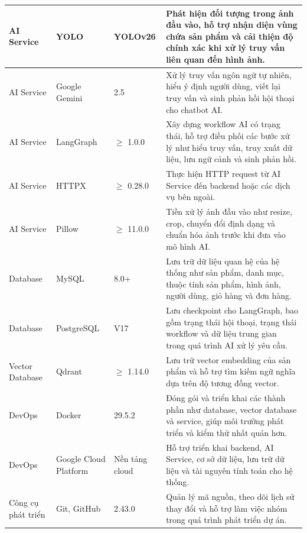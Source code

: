 \begin{longtable}{|p{2.6cm}|p{3.1cm}|p{2.4cm}|p{6.3cm}|}
AI Service 
& YOLO 
& YOLOv26
& Phát hiện đối tượng trong ảnh đầu vào, hỗ trợ nhận diện vùng chứa sản phẩm và cải thiện độ chính xác khi xử lý truy vấn liên quan đến hình ảnh. \\
\hline

AI Service 
& Google Gemini 
& 2.5
& Xử lý truy vấn ngôn ngữ tự nhiên, hiểu ý định người dùng, viết lại truy vấn và sinh phản hồi hội thoại cho chatbot AI. \\
\hline

AI Service 
& LangGraph 
& $\geq$ 1.0.0
& Xây dựng workflow AI có trạng thái, hỗ trợ điều phối các bước xử lý như hiểu truy vấn, truy xuất dữ liệu, lưu ngữ cảnh và sinh phản hồi. \\
\hline

AI Service 
& HTTPX 
& $\geq$ 0.28.0
& Thực hiện HTTP request từ AI Service đến backend hoặc các dịch vụ bên ngoài. \\
\hline

AI Service 
& Pillow 
& $\geq$ 11.0.0
& Tiền xử lý ảnh đầu vào như resize, crop, chuyển đổi định dạng và chuẩn hóa ảnh trước khi đưa vào mô hình AI. \\
\hline

Database 
& MySQL 
& 8.0+
& Lưu trữ dữ liệu quan hệ của hệ thống như sản phẩm, danh mục, thuộc tính sản phẩm, hình ảnh, người dùng, giỏ hàng và đơn hàng. \\
\hline

Database 
& PostgreSQL 
& V17
& Lưu checkpoint cho LangGraph, bao gồm trạng thái hội thoại, trạng thái workflow và dữ liệu trung gian trong quá trình AI xử lý yêu cầu. \\
\hline

Vector Database 
& Qdrant 
& $\geq$ 1.14.0
& Lưu trữ vector embedding của sản phẩm và hỗ trợ tìm kiếm ngữ nghĩa dựa trên độ tương đồng vector. \\
\hline

DevOps 
& Docker 
& 29.5.2 
& Đóng gói và triển khai các thành phần như database, vector database và service, giúp môi trường phát triển và kiểm thử nhất quán hơn. \\
\hline

DevOps 
& Google Cloud Platform 
& Nền tảng cloud
& Hỗ trợ triển khai backend, AI Service, cơ sở dữ liệu, lưu trữ dữ liệu và tài nguyên tính toán cho hệ thống. \\
\hline

Công cụ phát triển 
& Git, GitHub 
& 2.43.0
& Quản lý mã nguồn, theo dõi lịch sử thay đổi và hỗ trợ làm việc nhóm trong quá trình phát triển dự án. \\
\hline


\end{longtable}
